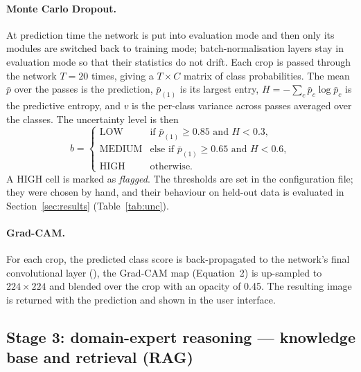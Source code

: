 \paragraph{Monte Carlo Dropout.} At prediction time the network is put into evaluation mode and then only its  modules are switched back to training mode; batch-normalisation layers stay in evaluation mode so that their statistics do not drift. Each crop is passed through the network $T = 20$ times, giving a $T \times C$ matrix of class probabilities. The mean $\bar{p}$ over the passes is the prediction, $\bar{p}_{(1)}$ is its largest entry, $H = -\sum_c \bar{p}_c \log \bar{p}_c$ is the predictive entropy, and $v$ is the per-class variance across passes averaged over the classes. The uncertainty level is then
\begin{equation}
b = \begin{cases}
\text{LOW} & \text{if } \bar{p}_{(1)} \ge 0.85 \text{ and } H < 0.3,\\
\text{MEDIUM} & \text{else if } \bar{p}_{(1)} \ge 0.65 \text{ and } H < 0.6,\\
\text{HIGH} & \text{otherwise.}
\end{cases}
\end{equation}
A HIGH cell is marked as \emph{flagged}. The thresholds are set in the configuration file; they were chosen by hand, and their behaviour on held-out data is evaluated in Section~\ref{sec:results} (Table~\ref{tab:unc}).

\paragraph{Grad-CAM.} For each crop, the predicted class score is back-propagated to the network's final convolutional layer (), the Grad-CAM map (Equation~2) is up-sampled to $224 \times 224$ and blended over the crop with an opacity of 0.45. The resulting image is returned with the prediction and shown in the user interface.

\subsection{Stage 3: domain-expert reasoning --- knowledge base and retrieval (RAG)}\label{sec:kb}

